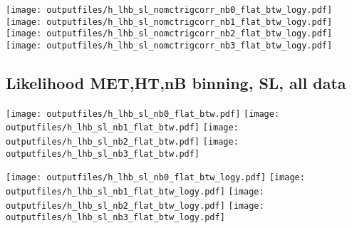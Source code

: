 \documentclass[11pt]{article}
\begin{document}
    \noindent
     \texttt{[image: outputfiles/h\_lhb\_sl\_nomctrigcorr\_nb0\_flat\_btw\_logy.pdf]}
     \texttt{[image: outputfiles/h\_lhb\_sl\_nomctrigcorr\_nb1\_flat\_btw\_logy.pdf]}
     \texttt{[image: outputfiles/h\_lhb\_sl\_nomctrigcorr\_nb2\_flat\_btw\_logy.pdf]}
     \texttt{[image: outputfiles/h\_lhb\_sl\_nomctrigcorr\_nb3\_flat\_btw\_logy.pdf]}

    \clearpage

    \subsection{ Likelihood MET,HT,nB binning, SL, all data}

    \noindent
     \texttt{[image: outputfiles/h\_lhb\_sl\_nb0\_flat\_btw.pdf]}
     \texttt{[image: outputfiles/h\_lhb\_sl\_nb1\_flat\_btw.pdf]}
     \texttt{[image: outputfiles/h\_lhb\_sl\_nb2\_flat\_btw.pdf]}
     \texttt{[image: outputfiles/h\_lhb\_sl\_nb3\_flat\_btw.pdf]}

    \noindent
     \texttt{[image: outputfiles/h\_lhb\_sl\_nb0\_flat\_btw\_logy.pdf]}
     \texttt{[image: outputfiles/h\_lhb\_sl\_nb1\_flat\_btw\_logy.pdf]}
     \texttt{[image: outputfiles/h\_lhb\_sl\_nb2\_flat\_btw\_logy.pdf]}
     \texttt{[image: outputfiles/h\_lhb\_sl\_nb3\_flat\_btw\_logy.pdf]}

    \clearpage



\end{document}
